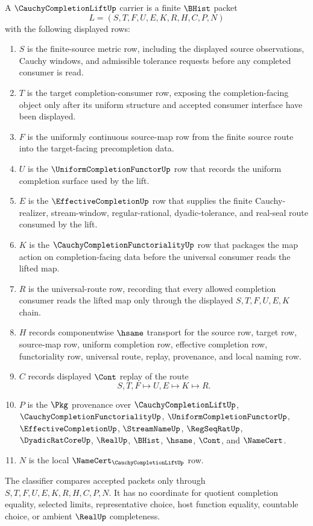 \begin{definition}
\label{def:cauchy-completion-lift-carrier}
A $\CauchyCompletionLiftUp$ carrier is a finite $\BHist$ packet
$$
L=(S,T,F,U,E,K,R,H,C,P,N)
$$
with the following displayed rows:
\begin{enumerate}
\item $S$ is the finite-source metric row, including the displayed source observations, Cauchy windows, and admissible tolerance requests before any completed consumer is read.
\item $T$ is the target completion-consumer row, exposing the completion-facing object only after its uniform structure and accepted consumer interface have been displayed.
\item $F$ is the uniformly continuous source-map row from the finite source route into the target-facing precompletion data.
\item $U$ is the $\UniformCompletionFunctorUp$ row that records the uniform completion surface used by the lift.
\item $E$ is the $\EffectiveCompletionUp$ row that supplies the finite Cauchy-realizer, stream-window, regular-rational, dyadic-tolerance, and real-seal route consumed by the lift.
\item $K$ is the $\CauchyCompletionFunctorialityUp$ row that packages the map action on completion-facing data before the universal consumer reads the lifted map.
\item $R$ is the universal-route row, recording that every allowed completion consumer reads the lifted map only through the displayed $S,T,F,U,E,K$ chain.
\item $H$ records componentwise $\hsame$ transport for the source row, target row, source-map row, uniform completion row, effective completion row, functoriality row, universal route, replay, provenance, and local naming row.
\item $C$ records displayed $\Cont$ replay of the route
$$
S,T,F \longmapsto U,E \longmapsto K \longmapsto R .
$$
\item $P$ is the $\Pkg$ provenance over $\CauchyCompletionLiftUp$, $\CauchyCompletionFunctorialityUp$, $\UniformCompletionFunctorUp$, $\EffectiveCompletionUp$, $\StreamNameUp$, $\RegSeqRatUp$, $\DyadicRatCoreUp$, $\RealUp$, $\BHist$, $\hsame$, $\Cont$, and $\NameCert$.
\item $N$ is the local $\NameCert_{\CauchyCompletionLiftUp}$ row.
\end{enumerate}
The classifier compares accepted packets only through $S,T,F,U,E,K,R,H,C,P,N$. It has no coordinate for quotient completion equality, selected limits, representative choice, host function equality, countable choice, or ambient $\RealUp$ completeness.
\end{definition}

